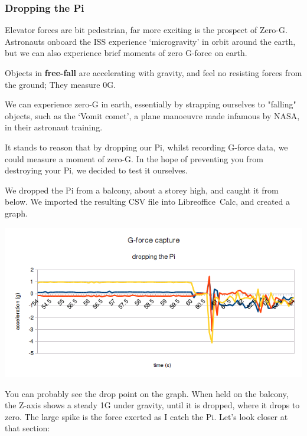 \documentclass[a4paper, twocolumn, twoside, 12pt]{article}
\newenvironment{aside}
		{
		\begin{mdframed}[
			style=0,%
			leftline=false,
			rightline=false,
			innerbottommargin=2pt,
			innerleftmargin=12pt,
			innerrightmargin=0pt,
			linewidth=0.75pt,
			skipabove=6pt,
			skipbelow=6pt
			]
				\small
				\color{JungleGreen}
				\setlength{\parskip}{2pt}
				\vspace{2pt} %
		}
		{
		\end{mdframed}
		}
\begin{document}
		\fi

		\subsubsection*{Dropping the Pi}
		
		Elevator forces are bit pedestrian, far more exciting is the prospect of Zero-G. Astronauts onboard the ISS experience `microgravity' in orbit around the earth, but we can also experience brief moments of zero G-force on earth.
		
		\begin{aside}
			Objects in \textbf{free-fall} are accelerating with gravity, and feel no resisting forces from the ground; They measure 0G.
			
			We can experience zero-G in earth, essentially by strapping ourselves to "falling" objects, such as the `Vomit comet', a plane manoeuvre made infamous by NASA, in their astronaut training.
		\end{aside}
		
		It stands to reason that by dropping our Pi, whilst recording G-force data, we could measure a moment of zero-G. In the hope of preventing you from destroying your Pi, we decided to test it ourselves.
		
		We dropped the Pi from a balcony, about a storey high, and caught it from below. We imported the resulting CSV file into \mbox{Libreoffice Calc}, and created a graph.
		
		\begin{center}
			\includegraphics[width=1\linewidth]{img/graph_whole}
		\end{center}
		
		You can probably see the drop point on the graph. When held on the balcony, the Z-axis shows a steady 1G under gravity, until it is dropped, where it drops to zero. The large spike is the force exerted as I catch the Pi. Let's look closer at that section:
\end{document}
